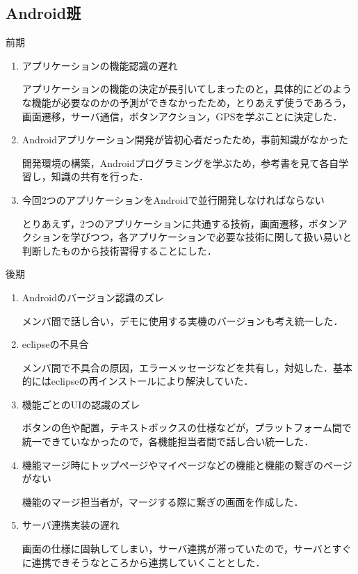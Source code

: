 \subsection{Android班}
前期

\begin{enumerate}
\item アプリケーションの機能認識の遅れ
\par
アプリケーションの機能の決定が長引いてしまったのと，具体的にどのような機能が必要なのかの予測ができなかったため，とりあえず使うであろう，画面遷移，サーバ通信，ボタンアクション，GPSを学ぶことに決定した．
\item Androidアプリケーション開発が皆初心者だったため，事前知識がなかった
\par
開発環境の構築，Androidプログラミングを学ぶため，参考書を見て各自学習し，知識の共有を行った．
\item 今回2つのアプリケーションをAndroidで並行開発しなければならない
\par
とりあえず，2つのアプリケーションに共通する技術，画面遷移，ボタンアクションを学びつつ，各アプリケーションで必要な技術に関して扱い易いと判断したものから技術習得することにした．
\end{enumerate}

後期

\begin{enumerate}
\item Androidのバージョン認識のズレ
\par
メンバ間で話し合い，デモに使用する実機のバージョンも考え統一した．
\item eclipseの不具合
\par
メンバ間で不具合の原因，エラーメッセージなどを共有し，対処した．基本的にはeclipseの再インストールにより解決していた．
\item 機能ごとのUIの認識のズレ
\par
ボタンの色や配置，テキストボックスの仕様などが，プラットフォーム間で統一できていなかったので，各機能担当者間で話し合い統一した．
\item 機能マージ時にトップページやマイページなどの機能と機能の繋ぎのページがない
\par
機能のマージ担当者が，マージする際に繋ぎの画面を作成した．
\item サーバ連携実装の遅れ
\par
画面の仕様に固執してしまい，サーバ連携が滞っていたので，サーバとすぐに連携できそうなところから連携していくこととした．
\end{enumerate}
